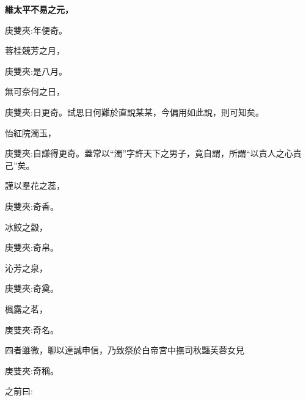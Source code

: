 \begin{qute2sp}
    \bfseries
    維太平不易之元，\begin{note}庚雙夾:年便奇。\end{note}蓉桂競芳之月，\begin{note}庚雙夾:是八月。\end{note}無可奈何之日，\begin{note}庚雙夾:日更奇。試思日何難於直說某某，今偏用如此說，則可知矣。\end{note}怡紅院濁玉，\begin{note}庚雙夾:自謙得更奇。蓋常以“濁”字許天下之男子，竟自謂，所謂“以責人之心責己”矣。\end{note}謹以羣花之蕊，\begin{note}庚雙夾:奇香。\end{note}冰鮫之縠，\begin{note}庚雙夾:奇帛。\end{note}沁芳之泉，\begin{note}庚雙夾:奇奠。\end{note}楓露之茗，\begin{note}庚雙夾:奇名。\end{note}四者雖微，聊以達誠申信，乃致祭於白帝宮中撫司秋豔芙蓉女兒\begin{note}庚雙夾:奇稱。\end{note}之前曰:




\end{qute2sp}
